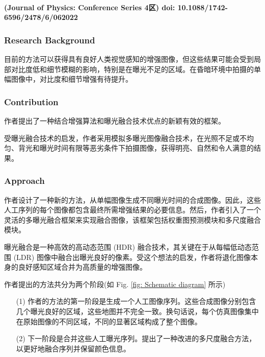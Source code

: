 \documentclass[a4paper]{ctexart}
\begin{document}
	\paragraph{(Journal of Physics: Conference Series 4区) doi: 10.1088/1742-6596/2478/6/062022}
	
	\subsubsection{Research Background}
	
	目前的方法可以获得具有良好人类视觉感知的增强图像，但这些结果可能会受到局部对比度低和细节模糊的影响，特别是在曝光不足的区域。在昏暗环境中拍摄的单幅图像中，对比度和细节增强有待提升。
	
	\subsubsection{Contribution}
	
	作者提出了一种结合增强算法和曝光融合技术优点的新颖有效的框架。
	
	受曝光融合技术的启发，作者采用模拟多曝光图像融合技术，在光照不足或不均匀、背光和曝光时间有限等恶劣条件下拍摄图像，获得明亮、自然和令人满意的结果。
	
	\subsubsection{Approach}
	
	作者设计了一种新的方法，从单幅图像生成不同曝光时间的合成图像。因此，这些人工序列的每个图像都包含最终所需增强结果的必要信息。然后，作者引入了一个灵活的多曝光融合框架来实现融合图像，该框架包括权重图预测模块和多尺度融合模块。
	
	曝光融合是一种高效的高动态范围 (HDR) 融合技术，其关键在于从每幅低动态范围 (LDR) 图像中融合出曝光良好的像素。受这个想法的启发，作者将退化图像本身的良好感知区域合并为高质量的增强图像。
	
	作者提出的方法共分为两个阶段(如 Fig. \ref{fig: Schematic diagram} 所示)
	
	\begin{itemize}
		\item[(1)] 
		作者的方法的第一阶段是生成一个人工图像序列。这些合成图像分别包含几个曝光良好的区域，这些地图并不完全一致。换句话说，每个仿真图像集中在原始图像的不同区域，不同的显著区域构成了整个图像。
		
		\item[(2)]
		下一阶段是合并这些人工曝光序列。提出了一种改进的多尺度融合方法，以更好地融合序列并保留颜色信息。
	\end{itemize}	
	
\end{document}

